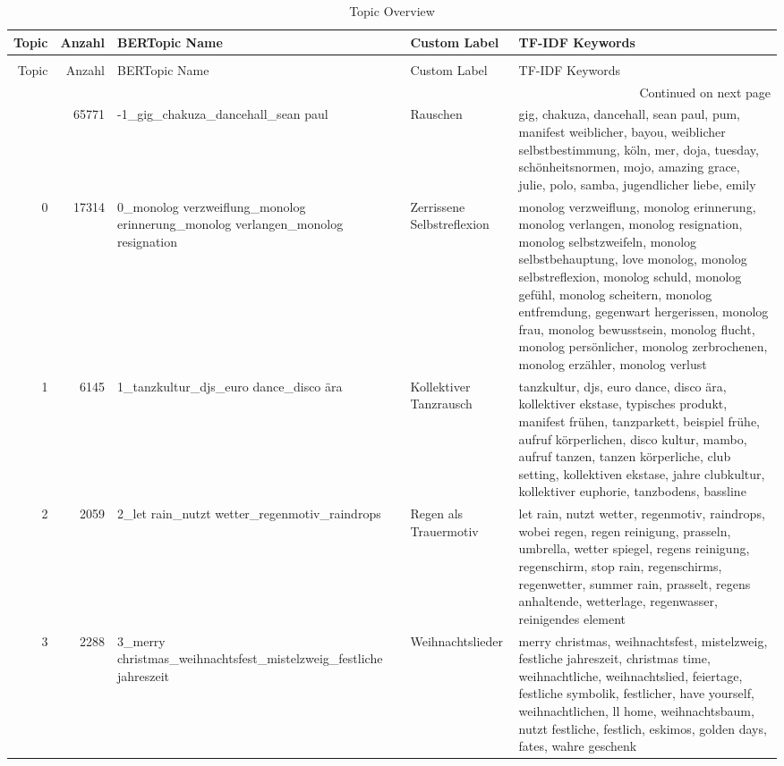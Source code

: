 \begin{longtable}{rrlll}
\caption{Topic Overview} \label{tab:topics} \\
\toprule
Topic & Anzahl & BERTopic Name & Custom Label & TF-IDF Keywords \\
\midrule
\endfirsthead
\caption[]{Topic Overview} \\
\toprule
Topic & Anzahl & BERTopic Name & Custom Label & TF-IDF Keywords \\
\midrule
\endhead
\midrule
\multicolumn{5}{r}{Continued on next page} \\
\midrule
\endfoot
\bottomrule
\endlastfoot
-1 & 65771 & -1\_gig\_chakuza\_dancehall\_sean paul & Rauschen & gig, chakuza, dancehall, sean paul, pum, manifest weiblicher, bayou, weiblicher selbstbestimmung, köln, mer, doja, tuesday, schönheitsnormen, mojo, amazing grace, julie, polo, samba, jugendlicher liebe, emily \\
0 & 17314 & 0\_monolog verzweiflung\_monolog erinnerung\_monolog verlangen\_monolog resignation & Zerrissene Selbstreflexion & monolog verzweiflung, monolog erinnerung, monolog verlangen, monolog resignation, monolog selbstzweifeln, monolog selbstbehauptung, love monolog, monolog selbstreflexion, monolog schuld, monolog gefühl, monolog scheitern, monolog entfremdung, gegenwart hergerissen, monolog frau, monolog bewusstsein, monolog flucht, monolog persönlicher, monolog zerbrochenen, monolog erzähler, monolog verlust \\
1 & 6145 & 1\_tanzkultur\_djs\_euro dance\_disco ära & Kollektiver Tanzrausch & tanzkultur, djs, euro dance, disco ära, kollektiver ekstase, typisches produkt, manifest frühen, tanzparkett, beispiel frühe, aufruf körperlichen, disco kultur, mambo, aufruf tanzen, tanzen körperliche, club setting, kollektiven ekstase, jahre clubkultur, kollektiver euphorie, tanzbodens, bassline \\
2 & 2059 & 2\_let rain\_nutzt wetter\_regenmotiv\_raindrops & Regen als Trauermotiv & let rain, nutzt wetter, regenmotiv, raindrops, wobei regen, regen reinigung, prasseln, umbrella, wetter spiegel, regens reinigung, regenschirm, stop rain, regenschirms, regenwetter, summer rain, prasselt, regens anhaltende, wetterlage, regenwasser, reinigendes element \\
3 & 2288 & 3\_merry christmas\_weihnachtsfest\_mistelzweig\_festliche jahreszeit & Weihnachtslieder & merry christmas, weihnachtsfest, mistelzweig, festliche jahreszeit, christmas time, weihnachtliche, weihnachtslied, feiertage, festliche symbolik, festlicher, have yourself, weihnachtlichen, ll home, weihnachtsbaum, nutzt festliche, festlich, eskimos, golden days, fates, wahre geschenk \\

\end{longtable}
